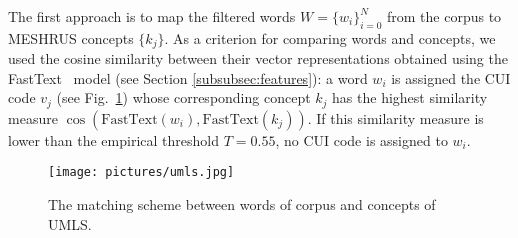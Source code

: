 \documentclass[a4paper,fleqn,longmktitle]{cas-dc}
\begin{document}

The first approach is to map the filtered words $W=\{w_{i}\}_{i=0}^N$ from the corpus to MESHRUS concepts $\{k_j\}$. As a criterion for comparing words and concepts, we used the cosine similarity between their vector representations obtained using the FastText~\cite{bojanowski2017enriching} model (see Section \ref{subsubsec:features}): a word $w_{i}$ is assigned the CUI code $v_{j}$ (see Fig.~\ref{fig:umls}) whose corresponding concept $k_j$ has the highest similarity measure $\cos\left(\mathrm{FastText}(w_{i}), \mathrm{FastText}(k_{j})\right)$. If this similarity measure is lower than the empirical threshold $T = 0.55$, no CUI code is assigned to $w_i$.
\begin{figure}
    \centering
    \texttt{[image: pictures/umls.jpg]}
    \caption{The matching scheme between words of corpus and concepts of UMLS.}
    \label{fig:umls}
\end{figure}


\end{document}
